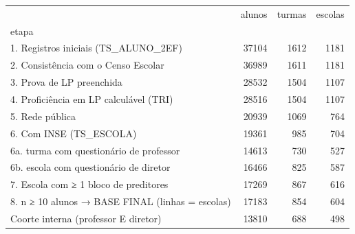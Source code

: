 \begin{tabular}{lrrr}
\toprule
 & alunos & turmas & escolas \\
etapa &  &  &  \\
\midrule
1. Registros iniciais (TS\_ALUNO\_2EF) & 37104 & 1612 & 1181 \\
2. Consistência com o Censo Escolar & 36989 & 1611 & 1181 \\
3. Prova de LP preenchida & 28532 & 1504 & 1107 \\
4. Proficiência em LP calculável (TRI) & 28516 & 1504 & 1107 \\
5. Rede pública & 20939 & 1069 & 764 \\
6. Com INSE (TS\_ESCOLA) & 19361 & 985 & 704 \\
   6a. turma com questionário de professor & 14613 & 730 & 527 \\
   6b. escola com questionário de diretor & 16466 & 825 & 587 \\
7. Escola com ≥ 1 bloco de preditores & 17269 & 867 & 616 \\
8. n ≥ 10 alunos → BASE FINAL (linhas = escolas) & 17183 & 854 & 604 \\
Coorte interna (professor E diretor) & 13810 & 688 & 498 \\
\bottomrule
\end{tabular}
